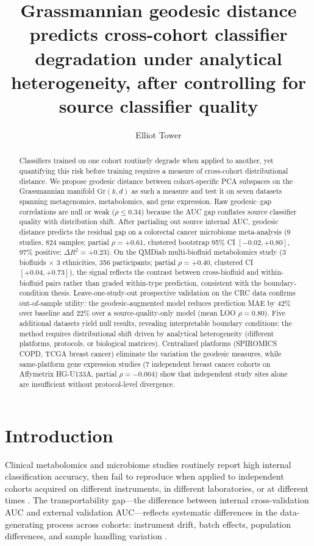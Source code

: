 \documentclass[11pt]{article}
\title{Grassmannian geodesic distance predicts cross-cohort classifier degradation under analytical heterogeneity, after controlling for source classifier quality}
\author{Elliot Tower}
\affil{Independent researcher, \texttt{elliot@elliottower.ai}}
\date{}
\begin{document}
\maketitle

\begin{abstract}
Classifiers trained on one cohort routinely degrade when applied to another, yet quantifying this risk before training requires a measure of cross-cohort distributional distance. We propose geodesic distance between cohort-specific PCA subspaces on the Grassmannian manifold $\mathrm{Gr}(k, d)$ as such a measure and test it on seven datasets spanning metagenomics, metabolomics, and gene expression. Raw geodesic--gap correlations are null or weak ($\rho \leq 0.34$) because the AUC gap conflates source classifier quality with distribution shift. After partialing out source internal AUC, geodesic distance predicts the residual gap on a colorectal cancer microbiome meta-analysis (9 studies, 824 samples; partial $\rho = +0.61$, clustered bootstrap 95\% CI $[-0.02, +0.80]$, 97\% positive; $\Delta R^2 = +0.23$). On the QMDiab multi-biofluid metabolomics study (3 biofluids $\times$ 3 ethnicities, 356 participants; partial $\rho = +0.40$, clustered CI $[+0.04, +0.73]$), the signal reflects the contrast between cross-biofluid and within-biofluid pairs rather than graded within-type prediction, consistent with the boundary-condition thesis. Leave-one-study-out prospective validation on the CRC data confirms out-of-sample utility: the geodesic-augmented model reduces prediction MAE by 42\% over baseline and 22\% over a source-quality-only model (mean LOO $\rho = 0.80$). Five additional datasets yield null results, revealing interpretable boundary conditions: the method requires distributional shift driven by analytical heterogeneity (different platforms, protocols, or biological matrices). Centralized platforms (SPIROMICS COPD, TCGA breast cancer) eliminate the variation the geodesic measures, while same-platform gene expression studies (7 independent breast cancer cohorts on Affymetrix HG-U133A, partial $\rho = -0.004$) show that independent study sites alone are insufficient without protocol-level divergence.
\end{abstract}

\section{Introduction}

Clinical metabolomics and microbiome studies routinely report high internal classification accuracy, then fail to reproduce when applied to independent cohorts acquired on different instruments, in different laboratories, or at different times \citep{broadhurst2006statistical}. The transportability gap---the difference between internal cross-validation AUC and external validation AUC---reflects systematic differences in the data-generating process across cohorts: instrument drift, batch effects, population differences, and sample handling variation \citep{wehrens2016improved}.
\end{document}
